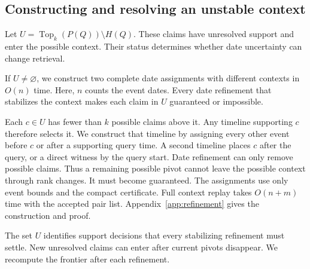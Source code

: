 \subsection{Constructing and resolving an unstable context}
Let $U=\operatorname{Top}_k(P(Q))\setminus H(Q)$.
These claims have unresolved support and enter the possible context.
Their status determines whether date uncertainty can change retrieval.

\begin{theorem}
\label{thm:refinement}
If $U\ne\varnothing$, we construct two complete date assignments with different contexts in $O(n)$ time.
Here, $n$ counts the event dates.
Every date refinement that stabilizes the context makes each claim in $U$ guaranteed or impossible.
\end{theorem}

Each $c\in U$ has fewer than $k$ possible claims above it.
Any timeline supporting $c$ therefore selects it.
We construct that timeline by assigning every other event before $c$ or after a supporting query time.
A second timeline places $c$ after the query, or a direct witness by the query start.
Date refinement can only remove possible claims.
Thus a remaining possible pivot cannot leave the possible context through rank changes.
It must become guaranteed.
The assignments use only event bounds and the compact certificate.
Full context replay takes $O(n+m)$ time with the accepted pair list.
Appendix~\ref{app:refinement} gives the construction and proof.

The set $U$ identifies support decisions that every stabilizing refinement must settle.
New unresolved claims can enter after current pivots disappear.
We recompute the frontier after each refinement.


